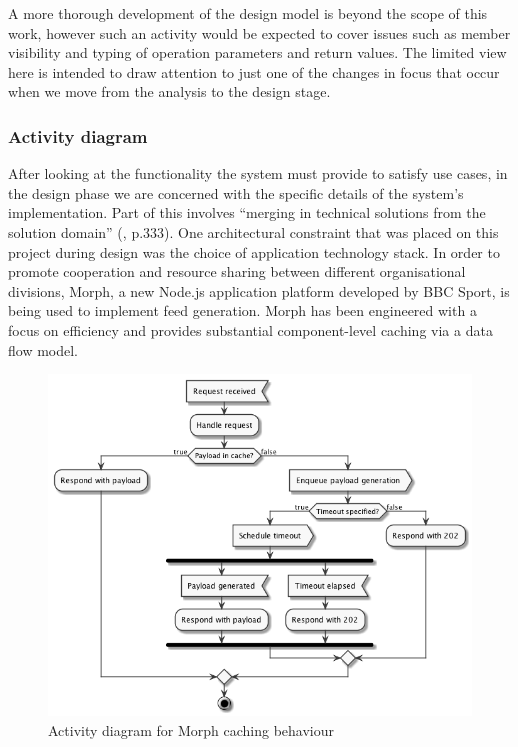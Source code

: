 \documentclass[runningheads,a4paper]{llncs}
\begin{document}
A more thorough development of the design model is beyond the scope of this work, however such an activity would be expected to cover issues such as member visibility and typing of operation parameters and return values. The limited view here is intended to draw attention to just one of the changes in focus that occur when we move from the analysis to the design stage.

\subsubsection{Activity diagram}

After looking at the functionality the system must provide to satisfy use cases, in the design phase we are concerned with the specific details of the system's implementation. Part of this involves ``merging in technical solutions from the solution domain'' (\cite{arlow}, p.333). One architectural constraint that was placed on this project during design was the choice of application technology stack. In order to promote cooperation and resource sharing between different organisational divisions, Morph, a new Node.js application platform developed by BBC Sport, is being used to implement feed generation. Morph has been engineered with a focus on efficiency and provides substantial component-level caching via a data flow model.

\begin{figure}
\centering
\includegraphics[width=\textwidth]{activity}
\caption{Activity diagram for Morph caching behaviour}
\label{fig:activity-diag}
\end{figure}
\end{document}
